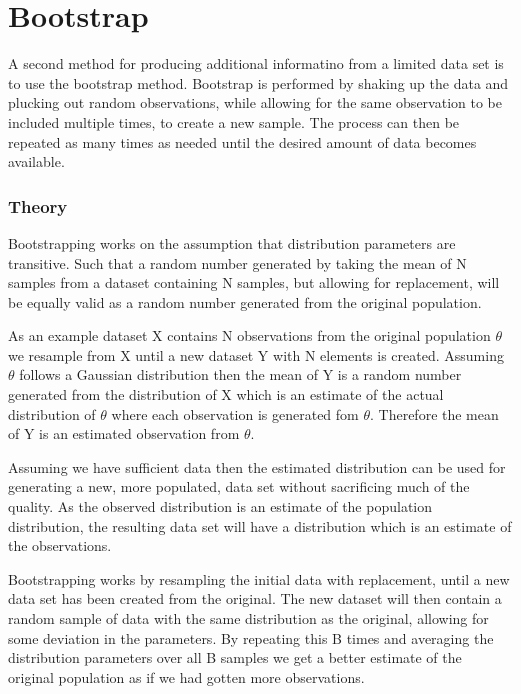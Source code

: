 \chapter{Bootstrap} \label{ch:bootstrap}

A second method for producing additional informatino from a limited data set is to use the bootstrap method. Bootstrap is performed by shaking up the data and plucking out random observations, while allowing for the same observation to be included multiple times, to create a new sample. The process can then be repeated as many times as needed until the desired amount of data becomes available. 

\subsection{Theory}

\iffalse
A good explanation https://stats.stackexchange.com/questions/26088/explaining-to-laypeople-why-bootstrapping-works
\fi

Bootstrapping works on the assumption that distribution parameters are transitive. Such that a random number generated by taking the mean of N samples from a dataset containing N samples, but allowing for replacement, will be equally valid as a random number generated from the original population.

As an example dataset X contains N observations from the original population $\theta$ we resample from X until a new dataset Y with N elements is created. Assuming $\theta$ follows a Gaussian distribution then the mean of Y is a random number generated from the distribution of X which is an estimate of the actual distribution of $\theta$ where each observation is generated fom $\theta$. Therefore the mean of Y is an estimated observation from $\theta$.

Assuming we have sufficient data then the estimated distribution can be used for generating a new, more populated, data set without sacrificing much of the quality. As the observed distribution is an estimate of the population distribution, the resulting data set will have a distribution which is an estimate of the observations.

\iffalse %
Bootstrapping works by resampling the initial data with replacement, until a new data set has been created from the original. The new dataset will then contain a random sample of data with the same distribution as the original, allowing for some deviation in the parameters. By repeating this B times and averaging the distribution parameters over all B samples we get a better estimate of the original population as if we had gotten more observations.

